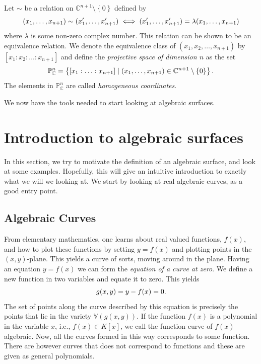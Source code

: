 \documentclass{article}
\newcommand{\C}{\ensuremath{\mathbb{C}}}
\newcommand{\V}{\ensuremath{\mathbb{V}}}
\renewcommand{\P}{\ensuremath{\mathbb{P}}}
\begin{document}
    \begin{definition}
        Let $\sim$ be a relation on $\C^{n+1} \setminus \left\{ 0 \right\}$ defined by
        \begin{equation}
            \notag
            (x_1, \ldots, x_{n+1}) \sim (x_1', \ldots, x_{n+1}')
            \iff (x_1', \ldots, x_{n+1}') = \lambda(x_1, \ldots,
            x_{n+1})
        \end{equation}
        where $\lambda$ is some non-zero complex number. This relation can be
        shown to be an equivalence relation. We denote the
        equivalence class of $(x_1, x_2, \ldots, x_{n+1})$ by $\left[ x_1 : x_2
        : \ldots : x_{n+1} \right]$ and define the \emph{projective space of
        dimension $n$} as the set 
        \begin{equation}
            \notag
            \P^{n}_\C = \left\{ \left[ x_1 : \ldots : x_{n+1} \right] \mid (x_1,
            \ldots , x_{n+1}) \in \C^{n+1}\setminus \left\{ 0 \right\}\right\}.
        \end{equation}
        The elements in $\P_\C^n$ are called \emph{homogeneous
        coordinates}. 
    \end{definition}


    We now have the tools needed to start looking at algebraic surfaces.
    
    \section{Introduction to algebraic surfaces}
    \label{sec:intro}    
    In this section, we try to motivate the definition of an algebraic surface,
    and look at some examples. Hopefully, this will give an intuitive
    introduction to exactly what we will we looking at. We start by looking at
    real algebraic curves, as a good entry point.

    \subsection{Algebraic Curves}
    \label{sub:algebraic_curves}
    
    From elementary mathematics, one learns about real valued functions,
    $f(x)$, and how to plot these functions by setting $y = f(x)$ and plotting
    points in the $(x, y)$-plane. This yields a curve of sorts, moving around
    in the plane.  Having an equation $y = f(x)$ we can form the \emph{equation
    of a curve at zero}. We define a new function in two variables and equate
    it to zero. This yields
    \begin{equation}
        \notag
        g(x, y) = y - f(x) = 0.
    \end{equation}
    The set of points along the curve described by this equation is precisely
    the points that lie in the variety $\V(g(x, y))$.  If the function $f(x)$
    is a polynomial in the variable $x$, i.e., $f(x) \in K[x]$, we call the
    function curve of $f(x)$ algebraic. Now, all the curves formed in this way
    corresponds to some function. There are however curves that does not
    correspond to functions and these are given as general polynomials.
\end{document}
